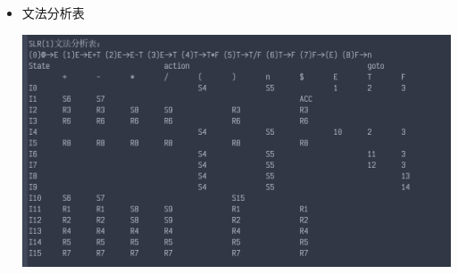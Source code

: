 \documentclass[fontset=none,UTF8,a4paper,zihao=-4]{ctexart}
\begin{document}
\begin{itemize}
\item 文法分析表

\begin{center}
\includegraphics[width=.9\linewidth]{运行截图/2020-11-26_00-54-22_screenshot.png}
\end{center}
\end{itemize}
\end{document}
